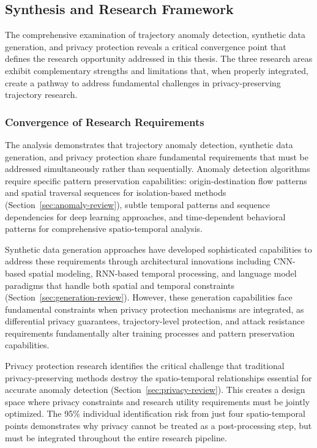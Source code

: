 \subsection{Synthesis and Research Framework}
\label{sec:synthesis}

The comprehensive examination of trajectory anomaly detection, synthetic data generation, and privacy protection reveals a critical convergence point that defines the research opportunity addressed in this thesis. The three research areas exhibit complementary strengths and limitations that, when properly integrated, create a pathway to address fundamental challenges in privacy-preserving trajectory research.

\subsubsection{Convergence of Research Requirements}

The analysis demonstrates that trajectory anomaly detection, synthetic data generation, and privacy protection share fundamental requirements that must be addressed simultaneously rather than sequentially. Anomaly detection algorithms require specific pattern preservation capabilities: origin-destination flow patterns and spatial traversal sequences for isolation-based methods (Section~\ref{sec:anomaly-review}), subtle temporal patterns and sequence dependencies for deep learning approaches, and time-dependent behavioral patterns for comprehensive spatio-temporal analysis.

Synthetic data generation approaches have developed sophisticated capabilities to address these requirements through architectural innovations including CNN-based spatial modeling, RNN-based temporal processing, and language model paradigms that handle both spatial and temporal constraints (Section~\ref{sec:generation-review}). However, these generation capabilities face fundamental constraints when privacy protection mechanisms are integrated, as differential privacy guarantees, trajectory-level protection, and attack resistance requirements fundamentally alter training processes and pattern preservation capabilities.

Privacy protection research identifies the critical challenge that traditional privacy-preserving methods destroy the spatio-temporal relationships essential for accurate anomaly detection (Section~\ref{sec:privacy-review}). This creates a design space where privacy constraints and research utility requirements must be jointly optimized. The 95\% individual identification risk from just four spatio-temporal points demonstrates why privacy cannot be treated as a post-processing step, but must be integrated throughout the entire research pipeline.


